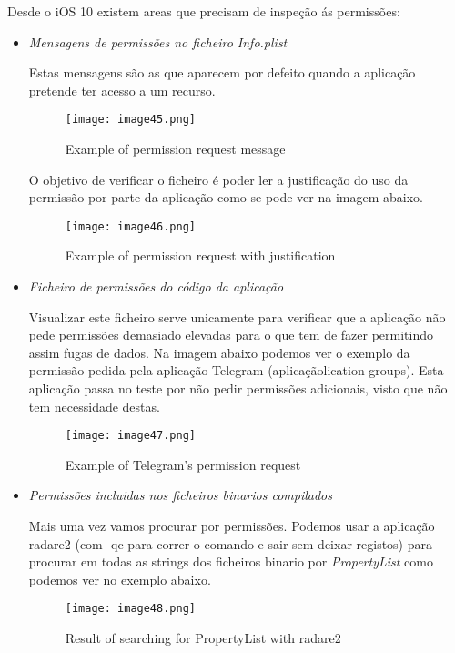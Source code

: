 Desde o iOS 10 existem areas que precisam de inspeção ás permissões:
\begin{itemize}
\item \textit{Mensagens de permissões no ficheiro Info.plist}\par
\hfill\par
	Estas mensagens são as que aparecem por defeito quando a aplicação pretende ter acesso a um recurso.

\begin{figure}[H]
\centering
\texttt{[image: image45.png]}
\caption {Example of permission request message}
\label {fig02}
\end{figure}
	O objetivo de verificar o ficheiro é poder ler a justificação do uso da permissão por parte da aplicação como se pode ver na imagem abaixo.
\begin{figure}[H]
\centering
\texttt{[image: image46.png]}
\caption {Example of permission request with justification}
\label {fig02}
\end{figure} 

\item \textit{Ficheiro de permissões do código da aplicação}\par
	\hfill\par

	Visualizar este ficheiro serve unicamente para verificar que a aplicação não pede permissões demasiado elevadas para o que tem de fazer permitindo assim fugas de dados.
	Na imagem abaixo podemos ver o exemplo da permissão pedida pela aplicação Telegram (aplicaçãolication-groups). Esta aplicação passa no teste por não pedir permissões adicionais, visto que não tem necessidade destas.

\begin{figure}[H]
\centering
\texttt{[image: image47.png]}
\caption {Example of Telegram's permission request}
\label {fig02}
\end{figure}

\item \textit{Permissões incluidas nos ficheiros binarios compilados}\par
\hfill\par
	Mais uma vez vamos procurar por permissões.
	Podemos usar a aplicação radare2 (com -qc para correr o comando e sair sem deixar registos) para procurar em todas as strings dos ficheiros binario por \textit{PropertyList} como podemos ver no exemplo abaixo.

\begin{figure}[H]
\centering
\texttt{[image: image48.png]}
\caption {Result of searching for PropertyList with radare2}
\label {fig02}
\end{figure}


\end{itemize}
